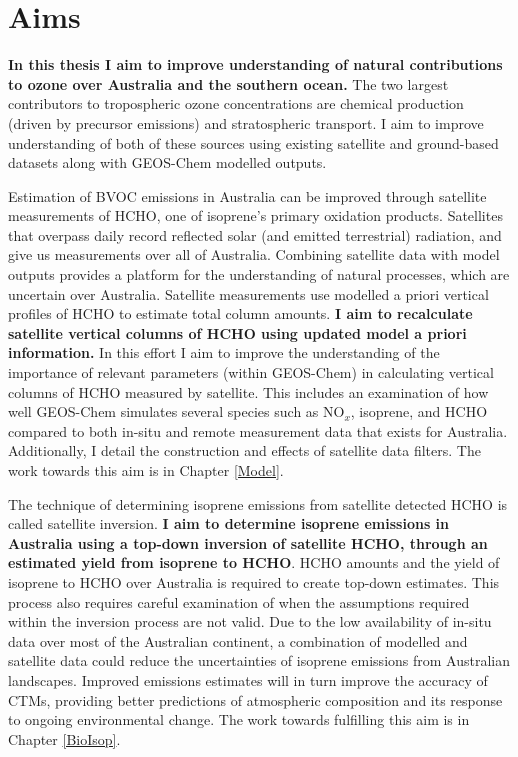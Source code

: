 \section{Aims}
\label{LR:Aims}

  \textbf{In this thesis I aim to improve understanding of natural contributions to ozone over Australia and the southern ocean.}
  The two largest contributors to tropospheric ozone concentrations are chemical production (driven by precursor emissions) and stratospheric transport.
  I aim to improve understanding of both of these sources using existing satellite and ground-based datasets along with GEOS-Chem modelled outputs.
  
  Estimation of BVOC emissions in Australia can be improved through satellite measurements of HCHO, one of isoprene's primary oxidation products.
  Satellites that overpass daily record reflected solar (and emitted terrestrial) radiation, and give us measurements over all of Australia.
  Combining satellite data with model outputs provides a platform for the understanding of natural processes, which are uncertain over Australia.
  Satellite measurements use modelled a priori vertical profiles of HCHO to estimate total column amounts.
  \textbf{I aim to recalculate satellite vertical columns of HCHO using updated model a priori information.}
  In this effort I aim to improve the understanding of the importance of relevant parameters (within GEOS-Chem) in calculating vertical columns of HCHO measured by satellite.
  This includes an examination of how well GEOS-Chem simulates several species such as NO$_x$, isoprene, and HCHO compared to both in-situ and remote measurement data that exists for Australia.
  Additionally, I detail the construction and effects of satellite data filters.
  The work towards this aim is in Chapter \ref{Model}.
  
  The technique of determining isoprene emissions from satellite detected HCHO is called satellite inversion.
  \textbf{I aim to determine isoprene emissions in Australia using a top-down inversion of satellite HCHO, through an estimated yield from isoprene to HCHO}.
  HCHO amounts and the yield of isoprene to HCHO over Australia is required to create top-down estimates.
  This process also requires careful examination of when the assumptions required within the inversion process are not valid.
  Due to the low availability of in-situ data over most of the Australian continent, a combination of modelled and satellite data could reduce the uncertainties of isoprene emissions from Australian landscapes.
  Improved emissions estimates will in turn improve the accuracy of CTMs, providing better predictions of atmospheric composition and its response to ongoing environmental change.
  The work towards fulfilling this aim is in Chapter \ref{BioIsop}.
  
